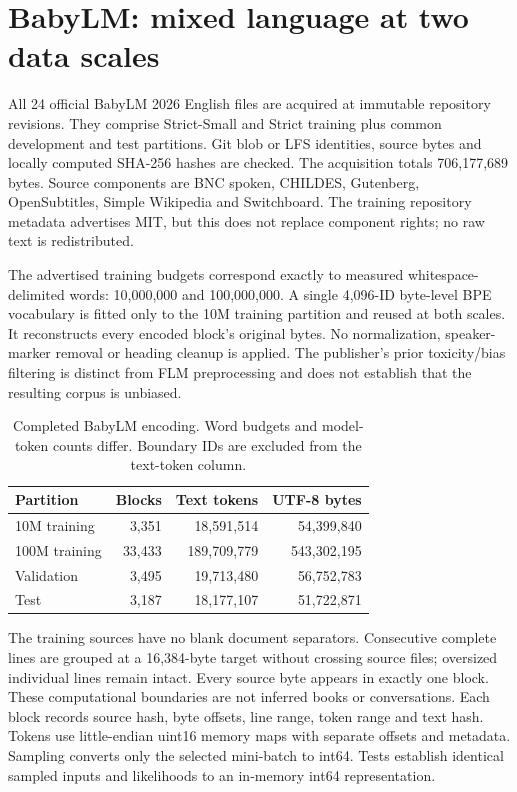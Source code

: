 \documentclass[10pt]{article}
\begin{document}
\section{BabyLM: mixed language at two data scales}
All 24 official BabyLM 2026 English files are acquired at immutable repository revisions. They comprise Strict-Small and Strict training plus common development and test partitions. Git blob or LFS identities, source bytes and locally computed SHA-256 hashes are checked. The acquisition totals 706,177,689 bytes. Source components are BNC spoken, CHILDES, Gutenberg, OpenSubtitles, Simple Wikipedia and Switchboard. The training repository metadata advertises MIT, but this does not replace component rights; no raw text is redistributed.

The advertised training budgets correspond exactly to measured whitespace-delimited words: 10,000,000 and 100,000,000. A single 4,096-ID byte-level BPE vocabulary is fitted only to the 10M training partition and reused at both scales. It reconstructs every encoded block's original bytes. No normalization, speaker-marker removal or heading cleanup is applied. The publisher's prior toxicity/bias filtering is distinct from FLM preprocessing and does not establish that the resulting corpus is unbiased.

\begin{table}[ht]\centering
\begin{tabular}{lrrr}\toprule
Partition & Blocks & Text tokens & UTF-8 bytes\\\midrule
10M training & 3,351 & 18,591,514 & 54,399,840\\
100M training & 33,433 & 189,709,779 & 543,302,195\\
Validation & 3,495 & 19,713,480 & 56,752,783\\
Test & 3,187 & 18,177,107 & 51,722,871\\\bottomrule
\end{tabular}
\caption{Completed BabyLM encoding. Word budgets and model-token counts differ. Boundary IDs are excluded from the text-token column.}
\end{table}

The training sources have no blank document separators. Consecutive complete lines are grouped at a 16,384-byte target without crossing source files; oversized individual lines remain intact. Every source byte appears in exactly one block. These computational boundaries are not inferred books or conversations. Each block records source hash, byte offsets, line range, token range and text hash. Tokens use little-endian uint16 memory maps with separate offsets and metadata. Sampling converts only the selected mini-batch to int64. Tests establish identical sampled inputs and likelihoods to an in-memory int64 representation.
\end{document}
